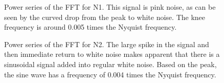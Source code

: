 \documentclass[twocolumn,11pt]{article}
\begin{document}
\begin{figure}[!h]
	\centering
	\noindent
      \caption{Power series of the FFT for N1. This signal is pink noise, as can be seen by the curved drop from the peak to white noise. The knee frequency is around 0.005 times the Nyquist frequency.}
\end{figure}

\begin{figure}[!h]
	\centering
	\noindent
      \caption{Power series of the FFT for N2. The large spike in the signal and then immediate return to white noise makes apparent that there is a sinusoidal signal added into regular white noise. Based on the peak, the sine wave has a frequency of 0.004 times the Nyquist frequency.}
\end{figure}
\end{document}
